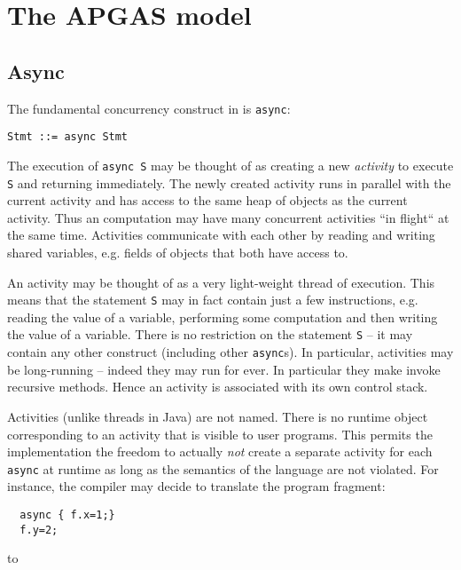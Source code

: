 \chapter{The APGAS model}\label{chap:apgas}


\section{Async}\label{sec:async}
The fundamental concurrency construct in \Xten{} is {\tt async}:

{\footnotesize
\begin{verbatim}
Stmt ::= async Stmt  
\end{verbatim}}

The execution of {\tt async S} may be thought of as creating a new
{\em activity} to execute {\tt S} and returning immediately. The newly
created activity runs in parallel with the current activity and has
access to the same heap of objects as the current activity. Thus an
\Xten{} computation may have many concurrent activities ``in flight``
at the same time. Activities communicate with each other by reading
and writing shared variables, e.g.{} fields of objects that both have
access to.

An activity may be thought of as a very light-weight thread of
execution. This means that the statement {\tt S} may in fact contain
just a few instructions, e.g.{} reading the value of a variable,
performing some computation and then writing the value of a
variable. There is no restriction on the statement {\tt S} -- it may
contain any other construct (including other {\tt async}s). In
particular, activities may be long-running -- indeed they may run for
ever. In particular they make invoke recursive methods. Hence an
activity is associated with its own control stack.

Activities (unlike threads in Java) are not named. There is no runtime
object corresponding to an activity that is visible to user
programs. This permits the implementation the freedom to actually {\em
  not} create a separate activity for each {\tt async} at runtime as
long as the semantics of the language are not violated. For instance,
the compiler may decide to translate the program fragment: 

{\footnotesize
\begin{verbatim}
  async { f.x=1;}
  f.y=2;
\end{verbatim}}

\noindent to


